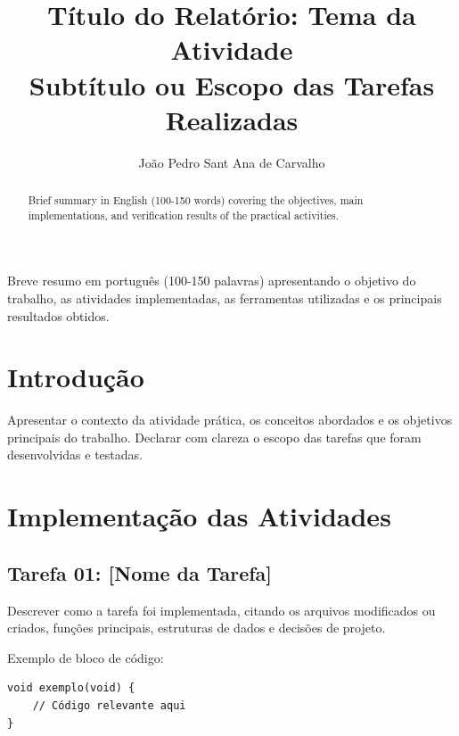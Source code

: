 \documentclass[12pt]{article}
\title{Título do Relatório: Tema da Atividade\\
\large Subtítulo ou Escopo das Tarefas Realizadas}
\author{João Pedro Sant Ana de Carvalho}
\begin{document}
\maketitle

\begin{abstract}
Brief summary in English (100-150 words) covering the objectives, main implementations, and verification results of the practical activities.
\end{abstract}

\begin{resumo}
Breve resumo em português (100-150 palavras) apresentando o objetivo do trabalho, as atividades implementadas, as ferramentas utilizadas e os principais resultados obtidos.
\end{resumo}

\section{Introdução}

Apresentar o contexto da atividade prática, os conceitos abordados e os objetivos principais do trabalho. Declarar com clareza o escopo das tarefas que foram desenvolvidas e testadas.

\section{Implementação das Atividades}

\subsection{Tarefa 01: [Nome da Tarefa]}

Descrever como a tarefa foi implementada, citando os arquivos modificados ou criados, funções principais, estruturas de dados e decisões de projeto.

Exemplo de bloco de código:
\begin{verbatim}
void exemplo(void) {
    // Código relevante aqui
}
\end{verbatim}
\end{document}
